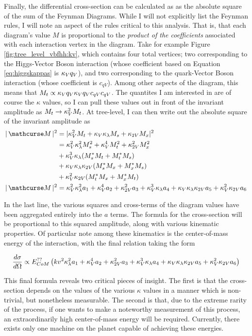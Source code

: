     Finally, the differential cross-section can be calculated as as the absolute square of the sum of the Feynman Diagrams.
    While I will not explicitly list the Feynman rules, I will note an aspect of the rules critical to this analysis.
    That is, that each diagram's value $M$ is proportional to the \textit{product of the coefficients}
        associated with each interaction vertex in the diagram.
    Take for example Figure \ref{fig:tree_level_vbfhh:kv}, which contains four total vertices;
        two corresponding to the Higgs-Vector Boson interaction (whose coefficient based on Equation \ref{eq:higgskappas} is $\kappa_{V} q_V$),
        and two corresponding to the quark-Vector Boson interaction (whose coefficient is $c_{qV}$).
    Among other aspects of the diagram, this means that $M_t \propto \kappa_{V} q_V \kappa_{V} q_V c_{qV} c_{qV}$.
    The quantites I am interested in are of course the $\kappa$ values,
        so I can pull these values out in front of the invariant amplitude as $M_t \rightarrow \kappa_{V}^2 M_t$.
    At tree-level, I can then write out the absolute square of the invariant amplitude as
    \begin{equation} \begin{split}
        |\invAmp|^2 &= |  \kv^2 M_t + \kv \kl M_s + \kvv M_x |^2
        \\&= \kv^2 \kl^2 M_s^2 + \kv^4 M_t^2 + \kvv^2 M_x^2 
            \\&+ \kv^3 \kl (M_s^* M_t + M_t^* M_s) 
            \\&+ \kv \kl \kvv (M_s^* M_x + M_x^* M_s ) 
            \\&+ \kv^2 \kvv (M_t^* M_x + M_x^* M_t )
        \\|\invAmp|^2 &= \kv^2 \kl^2 a_1 + \kv^4 a_2 + \kvv^2 a_3 + \kv^3 \kl a_4 + \kv \kl \kvv a_5 + \kv^2 \kvv a_6
    \end{split} \end{equation}

    In the last line, the various squares and cross-terms of the diagram values have been aggregated entirely into the $a$ terms.
    The formula for the cross-section will be proportional to this squared amplitude, along with various kinematic properties.
    Of particular note among these kinematics is the center-of-mass energy of the interaction, with the final relation taking the form

    \begin{equation} \label{eq:dXsec_final} %
        \dXsec \propto E_{CoM}^{??}\left(kv^2 \kl^2 a_1 + \kv^4 a_2 + \kvv^2 a_3 + \kv^3 \kl a_4 + \kv \kl \kvv a_5 + \kv^2 \kvv a_6 \right)
    \end{equation}

    This final formula reveals two critical pieces of insight.
    The first is that the cross-section depends on the values of the various $\kappa$ values in a manner which is non-trivial,
        but nonetheless measurable.
    The second is that, due to the extreme rarity of the process,
        if one wants to make a noteworthy measurement of this process,
        an extraordinarily high center-of-mass energy will be required.
    Currently, there exists only one machine on the planet capable of achieving these energies.
